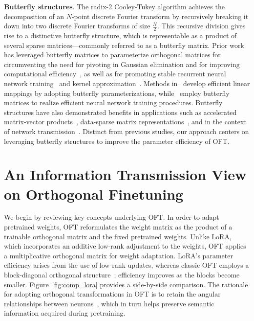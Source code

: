 \textbf{Butterfly structures}. The radix-2 Cooley-Tukey algorithm achieves the decomposition of an $N$-point discrete Fourier transform by recursively breaking it down into two discrete Fourier transforms of size $\frac{N}{2}$. This recursive division gives rise to a distinctive butterfly structure, which is representable as a product of several sparse matrices—commonly referred to as a butterfly matrix. Prior work has leveraged butterfly matrices to parameterize orthogonal matrices for circumventing the need for pivoting in Gaussian elimination and for improving computational efficiency~\cite{parker1995random}, as well as for promoting stable recurrent neural network training~\cite{jing2017tunable} and kernel approximation~\cite{munkhoeva2018quadrature}. Methods in~\cite{dao2019learning,dao2019kaleidoscope} develop efficient linear mappings by adopting butterfly parameterizations, while~\cite{chen2022pixelated,dao2022monarch} employ butterfly matrices to realize efficient neural network training procedures. Butterfly structures have also demonstrated benefits in applications such as accelerated matrix-vector products~\cite{michielssen1996multilevel,o2010algorithm}, data-sparse matrix representations~\cite{li2015butterfly}, and in the context of network transmission~\cite{klasing1994broadcasting,li2003linear,rajasingh2016transmission}. Distinct from previous studies, our approach centers on leveraging butterfly structures to improve the parameter efficiency of OFT.

\section{An Information Transmission View on Orthogonal Finetuning}

We begin by reviewing key concepts underlying OFT. In order to adapt pretrained weights, OFT reformulates the weight matrix as the product of a trainable orthogonal matrix and the fixed pretrained weights. Unlike LoRA, which incorporates an additive low-rank adjustment to the weights, OFT applies a multiplicative orthogonal matrix for weight adaptation. LoRA’s parameter efficiency arises from the use of low-rank updates, whereas classic OFT employs a block-diagonal orthogonal structure~\cite{qiu2023controlling}; efficiency improves as the blocks become smaller. Figure~\ref{fig:comp_lora} provides a side-by-side comparison. The rationale for adopting orthogonal transformations in OFT is to retain the angular relationships between neurons~\cite{liu2018learning,liu2021orthogonal,qiu2023controlling}, which in turn helps preserve semantic information acquired during pretraining. 

